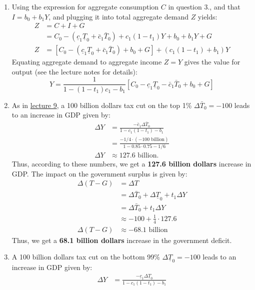 \documentclass[]{book}
\begin{document}
\begin{enumerate}
\item
  Using the expression for aggregate consumption \(C\) in question 3.,
  and that \(I=b_0+b_1 Y\), and plugging it into total aggregate demand
  \(Z\) yields: \[
  \begin{aligned}
  Z   &=C+I+G\\
  &=C_0 -\left(\underline{c}_{1}\underline{T}_0+\bar{c}_{1}\bar{T}_0\right)+c_1 (1-t_1) Y + b_{0}+b_{1}Y+G\\
  Z   &=\left[C_0 -\left(\underline{c}_{1}\underline{T}_0+\bar{c}_{1}\bar{T}_0\right)+ b_{0} + G \right]+ \left(c_1(1-t_1) + b_1\right) Y 
  \end{aligned}
  \] Equating aggregate demand to aggregate income \(Z = Y\) gives the
  value for output (see the lecture notes for details):
  \[\boxed{Y=\frac{1}{1-\left(1-t_{1}\right)c_{1}-b_{1}}\left[C_0-\underline{c}_{1}\underline{T}_{0}-\bar{c}_{1}\bar{T}_{0}+b_{0}+G\right]}\]
\item
  As in \protect\hyperlink{redistributive}{lecture 9}, a 100 billion
  dollars tax cut on the top 1\% \(\Delta \bar{T}_0 = -100\) leads to an
  increase in GDP given by: \[
  \begin{aligned}
  \Delta Y &=\frac{-\bar{c}_1 \Delta \bar{T}_0}{1-c_1(1-t_1)-b_1}\\
  &=\frac{-1/4 \cdot (-100 \text{ billion})}{1-0.85 \cdot 0.75-1/6}\\
  \Delta Y&\approx 127.6 \text{ billion}.
  \end{aligned}
  \] Thus, according to these numbers, we get a \textbf{127.6 billion
  dollars} increase in GDP. The impact on the government surplus is
  given by: \[
  \begin{aligned}
  \Delta\left(T-G\right)&=\Delta T\\
  &=\Delta\bar{T}_{0}+\Delta\underline{T}_{0}+t_1\Delta Y\\
  &=\Delta\bar{T}_{0}+t_1\Delta Y \\
  & \approx -100 + \frac{1}{4} \cdot 127.6\\
  \Delta\left(T-G\right)  & \approx-68.1 \text{ billion}
  \end{aligned}
  \] Thus, we get a \textbf{68.1 billion dollars} increase in the
  government deficit.
\item
  A 100 billion dollars tax cut on the bottom 99\%
  \(\Delta \underline{T}_0 = -100\) leads to an increase in GDP given
  by: \[
  \begin{aligned}
  \Delta Y &=\frac{-\underline{c}_1 \Delta \underline{T}_0}{1-c_1(1-t_1)-b_1}\\

\end{aligned}\]
\end{enumerate}
\end{document}
